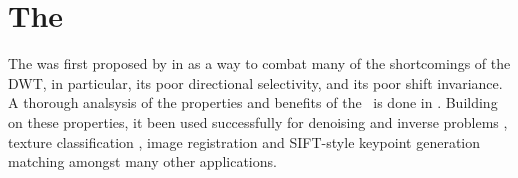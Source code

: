 
% 
\section{The \DTCWT}
  The \DTCWT was first proposed by \citeauthor{kingsbury_dual-tree_1998} in
  \cite{kingsbury_dual-tree_1998, kingsbury_dual-tree_1998-1} as a way to combat
  many of the shortcomings of the DWT, in particular, its poor directional
  selectivity, and its poor shift invariance. A thorough analsysis of the
  properties and benefits of the \DTCWT\ is done in
  \cite{kingsbury_image_1999,selesnick_dual-tree_2005}. Building on these
  properties, it been used
  successfully for denoising and inverse problems \cite{rivaz_bayesian_2001,
  zhang_bayesian_2008, zhang_variational_2015, miller_image_2008}, texture
  classification \cite{hatipoglu_texture_1999, rivaz_complex_1999}, image
  registration \cite{loo_motion-estimation-based_2001, chen_efficient_2012}
  and
  SIFT-style keypoint generation matching \cite{fauqueur_multiscale_2006,
  anderson_determining_2005, anderson_rotation-invariant_2006,
  bendale_multiscale_2010, ng_robust_2012} amongst many other applications. 

